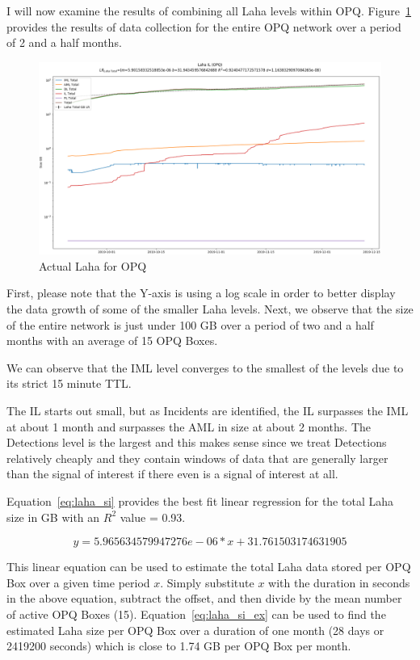 I will now examine the results of combining all Laha levels within OPQ. Figure~\ref{fig:actual_laha_opq} provides the results of data collection for the entire OPQ network over a period of 2 and a half months.

\begin{figure}[H]
    \centering
    \includegraphics[width=\linewidth]{figures/actual_laha_opq.png}
    \caption{Actual Laha for OPQ}
    \label{fig:actual_laha_opq}
\end{figure}

First, please note that the Y-axis is using a log scale in order to better display the data growth of some of the smaller Laha levels. Next, we observe that the size of the entire network is just under 100 GB over a period of two and a half months with an average of 15 OPQ Boxes.

We can observe that the IML level converges to the smallest of the levels due to its strict 15 minute TTL.

The IL starts out small, but as Incidents are identified, the IL surpasses the IML at about 1 month and surpasses the AML in size at about 2 months. The Detections level is the largest and this makes sense since we treat Detections relatively cheaply and they contain windows of data that are generally larger than the signal of interest if there even is a signal of interest at all.

Equation~\ref{eq:laha_si} provides the best fit linear regression for the total Laha size in GB with an $R^2$ value = 0.93.

\begin{equation}
    y = 5.965634579947276e-06 * x + 31.761503174631905
    \label{eq:laha_si}
\end{equation}

This linear equation can be used to estimate the total Laha data stored per OPQ Box over a given time period $x$. Simply substitute $x$ with the duration in seconds in the above equation, subtract the offset, and then divide by the mean number of active OPQ Boxes (15). Equation~\ref{eq:laha_si_ex} can be used to find the estimated Laha size per OPQ Box over a duration of one month (28 days or 2419200 seconds) which is close to 1.74 GB per OPQ Box per month.

